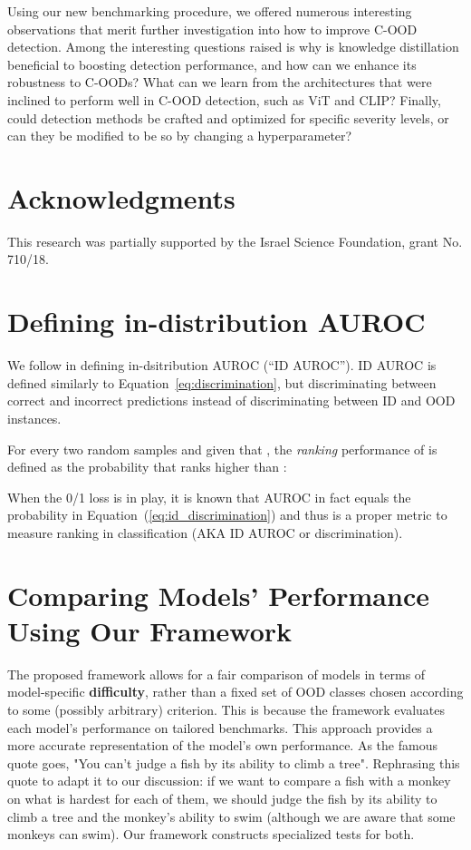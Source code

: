 \documentclass[table]{article} \usepackage{PRIMEarxiv}
\begin{document}
Using our new benchmarking procedure, we offered numerous interesting observations that merit further investigation into how to improve C-OOD detection. Among the interesting questions raised is why is knowledge distillation beneficial to boosting detection performance, and how can we enhance its robustness to C-OODs? 
What can we learn from the architectures that were inclined to perform well in C-OOD detection, such as ViT and CLIP?
Finally, could detection methods be crafted and optimized for specific severity levels, or can they be modified to be so by changing a hyperparameter?

\section*{Acknowledgments}
This research was partially supported by the Israel Science Foundation, grant No. 710/18.





\appendix

\section{Defining in-distribution AUROC}
\label{sec:id-auroc}

We follow \citet{galil2023what} in defining in-dsitribution AUROC (``ID AUROC''). ID AUROC is defined similarly to Equation~\ref{eq:discrimination}, but discriminating between correct and incorrect predictions instead of discriminating between ID and OOD instances.

For every two random samples  and given that , the \emph{ranking} performance of  is defined as the probability that  ranks  higher than : 

When the 0/1 loss is in play, it is known that AUROC in fact equals the probability in Equation~(\ref{eq:id_discrimination}) \citep{FAWCETT2006861} and thus is a proper metric to measure ranking in classification (AKA ID AUROC or discrimination).

\section{Comparing Models' Performance Using Our Framework}
\label{sec:criticism-comparison}
The proposed framework allows for a fair comparison of models in terms of model-specific \textbf{difficulty}, rather than a fixed set of OOD classes chosen according to some (possibly arbitrary) criterion.
This is because the framework evaluates each model's performance on tailored benchmarks. This approach provides a more accurate representation of the model's own performance.
As the famous quote goes, "You can't judge a fish by its ability to climb a tree". Rephrasing this quote to adapt it to our discussion: if we want to compare a fish with a monkey on what is hardest for each of them, we should judge the fish by its ability to climb a tree and the monkey's ability to swim (although we are aware that some monkeys can swim). Our framework constructs specialized tests for both.
\end{document}
